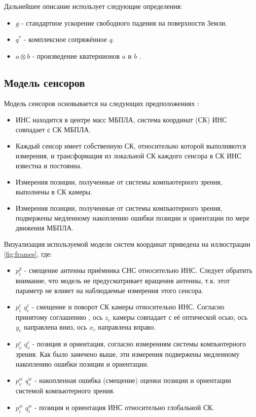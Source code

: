 \documentclass[11pt,a4paper]{article}
\begin{document}
Дальнейшее описание использует следующие определения:

\begin{itemize}
    \item $g$ - стандартное ускорение свободного падения на поверхности Земли.
    \item $q^*$ - комплексное сопряжённое $q$.
    \item $a \otimes b$ - произведение кватернионов $a$ и $b$ \cite{QuaternionsMadgwick}.
\end{itemize}

\subsection{Модель сенсоров}

Модель сенсоров основывается на следующих предположениях \cite{weiss2012vision}:

\begin{itemize}
    \item ИНС находится в центре масс МБПЛА, система координат (СК) ИНС совпадает с СК МБПЛА.
    \item Каждый сенсор имеет собственную СК, относительно которой выполняются измерения, и трансформация из локальной СК каждого сенсора в СК ИНС известна и постоянна.
    \item Измерения позиции, полученные от системы компьютерного зрения, выполнены в СК камеры.
    \item Измерения позиции, полученные от системы компьютерного зрения, подвержены медленному накоплению ошибки позиции и ориентации по мере движения МБПЛА.
\end{itemize}

Визуализация используемой модели систем координат приведена на иллюстрации \ref{fig:frames}, где:

\begin{itemize}
    \item $p_i^g$ - смещение антенны приёмника СНС относительно ИНС. Следует обратить внимание, что модель не предусматривает вращения антенны, т.к. этот параметр не влияет на наблюдаемые измерения этого сенсора.
    \item $p_i^c$ $q_i^c$ - смещение и поворот СК камеры относительно ИНС. Согласно принятому соглашению \cite{ROSFrames}, ось $z_c$ камеры совпадает с её оптической осью, ось $y_c$ направлена вниз, ось $x_c$ направлена вправо.
    \item $p_v^c$ $q_v^c$ - позиция и ориентация, согласно измерениям системы компьютерного зрения. Как было замечено выше, эти измерения подвержены медленному накоплению ошибки позиции и ориентации.
    \item $p_v^w$ $q_v^w$ - накопленная ошибка (смещение) оценки позиции и ориентации системой компьютерного зрения.
    \item $p_i^w$ $q_i^w$ - позиция и ориентация ИНС относительно глобальной СК.
\end{itemize}
\end{document}
